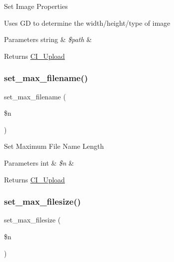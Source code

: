 Set Image Properties

Uses GD to determine the width/height/type of image


\begin{DoxyParams}[1]{Parameters}
string & {\em \$path} & \\
\hline
\end{DoxyParams}
\begin{DoxyReturn}{Returns}
\mbox{\hyperlink{class_c_i___upload}{C\+I\+\_\+\+Upload}} 
\end{DoxyReturn}
\mbox{\label{class_c_i___upload_aa288c7337b534788b32d66b23e25548e}} 
\subsubsection{\texorpdfstring{set\+\_\+max\+\_\+filename()}{set\_max\_filename()}}
{\footnotesize\ttfamily set\+\_\+max\+\_\+filename (\begin{DoxyParamCaption}\item[{}]{\$n }\end{DoxyParamCaption})}

Set Maximum File Name Length


\begin{DoxyParams}[1]{Parameters}
int & {\em \$n} & \\
\hline
\end{DoxyParams}
\begin{DoxyReturn}{Returns}
\mbox{\hyperlink{class_c_i___upload}{C\+I\+\_\+\+Upload}} 
\end{DoxyReturn}
\mbox{\label{class_c_i___upload_a1f78c3a54f32d313294b27cde4eafaf4}} 
\subsubsection{\texorpdfstring{set\+\_\+max\+\_\+filesize()}{set\_max\_filesize()}}
{\footnotesize\ttfamily set\+\_\+max\+\_\+filesize (\begin{DoxyParamCaption}\item[{}]{\$n }\end{DoxyParamCaption})}

